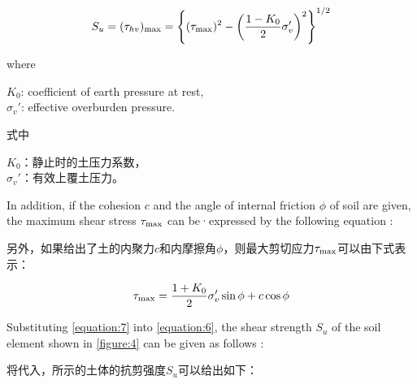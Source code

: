 \begin{align}
    S_u=(\tau_{hv})_{\rm{max}}=\left\{(\tau_{\rm{max}})^2-\left(\dfrac{1-K_0}{2}\sigma_v'\right)^2\right\}^{1/2}
    \label{equation:6}
\end{align}

\begin{paracol}{2}
    
    \newlength{\length}
    \settowidth{\length}{$K_0$: coefficient of earth pressure at rest}
    \noindent where \begin{minipage}[t]{\length}
        $K_0$: coefficient of earth pressure at rest, \\
        $\sigma_v'$: effective overburden pressure. 
    \end{minipage}\vspace{4pt}
    
    \switchcolumn

    \newlength{\cnlength}
    \settowidth{\cnlength}{$K_0$：静止时的土压力系数}
    \noindent 式中\begin{minipage}[t]{\cnlength}
        $K_0$：静止时的土压力系数，\\
        $\sigma_v'$：有效上覆土压力。
    \end{minipage}\vspace{4pt}

    \switchcolumn*

    In addition, if the cohesion $c$ and the angle of internal friction $\phi$ of soil are given, the maximum shear stress $\tau_{\rm{max}}$ can be·expressed by the following equation :

    \switchcolumn

    另外，如果给出了土的内聚力$c$和内摩擦角$\phi$，则最大剪切应力$\tau_{\rm{max}}$可以由下式表示：

\end{paracol}

\begin{align}
    \tau_{\rm{max}}=\dfrac{1+K_0}{2}\sigma_v'\sin\phi+c\cos\phi
    \label{equation:7}
\end{align}

\begin{paracol}{2}
    
    Substituting \autoref{equation:7} into \autoref{equation:6}, the shear strength $S_u$ of the soil element shown in \autoref{figure:4} can be given as follows :

    \switchcolumn

    将代入，所示的土体的抗剪强度$S_u$可以给出如下：

\end{paracol}

